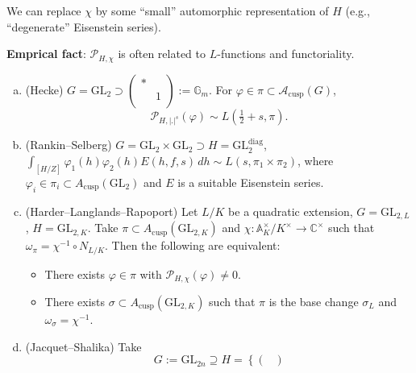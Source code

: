 \documentclass[reqno]{amsart} 
\numberwithin{theorem}{section}
\numberwithin{equation}{section}
\numberwithin{exercise}{section}
\begin{document}
\begin{remark}\label{remark:cq6tho3lbh}
  We can replace $\chi$ by some ``small'' automorphic representation of $H$ (e.g., ``degenerate'' Eisenstein series).
\end{remark}

\textbf{Emprical fact}: $\mathcal{P}_{H, \chi}$ is often related to $L$-functions and functoriality.

\begin{example}\label{example:cq6tho6g4r}
  \begin{enumerate}[(a)]
  \item (Hecke) $G = \mathrm{GL}_2 \supset \left(
      \begin{smallmatrix}
        \ast&\\
                               &1 \\
      \end{smallmatrix}
    \right) := \mathbb{G}_m$.  For $\varphi \in \pi \subset \mathcal{A}_{\mathrm{cusp}}(G)$,
    \begin{equation*}
      \mathcal{P}_{H, \lvert . \rvert^s}(\varphi) \sim L(\tfrac{1}{2} + s, \pi).
    \end{equation*}
  \item (Rankin--Selberg) $G = \mathrm{GL}_2 \times \mathrm{GL}_2 \supset H = \mathrm{GL}_2^{\mathrm{diag}}$, $\int_{[H/Z]} \varphi_1(h) \varphi_2(h) E(h, f, s) \, d h \sim L(s, \pi_1 \times \pi_2)$, where $\varphi_i \in \pi_i \subset A_{\mathrm{cusp}}(\mathrm{GL}_2)$ and $E$ is a suitable Eisenstein series.
  \item (Harder--Langlands--Rapoport) Let $L/K$ be a quadratic extension, $G =\mathrm{GL}_{2, L}$, $H =\mathrm{GL}_{2, K}$.  Take $\pi \subset A_{\mathrm{cusp}}(\mathrm{GL}_{2, K})$ and $\chi : \mathbb{A}_K^\times / K^\times \rightarrow \mathbb{C}^\times$ such that $\omega_\pi = \chi^{-1} \circ N_{L/K}$.  Then the following are equivalent:
    \begin{itemize}
    \item There exists $\varphi \in \pi$ with $\mathcal{P}_{H, \chi}(\varphi) \neq 0$.
    \item There exists $\sigma \subset A_{\mathrm{cusp}}(\mathrm{GL}_{2, K})$ such that $\pi$ is the base change $\sigma_L$ and $\omega_\sigma = \chi^{-1}$.
    \end{itemize}
  \item (Jacquet--Shalika)
    Take
    \begin{equation*}
      G :=\mathrm{GL}_{2 n} \supseteq H = \left\{
        \begin{pmatrix}

\end{pmatrix}
\end{equation*}
\end{enumerate}
\end{example}
\end{document}

